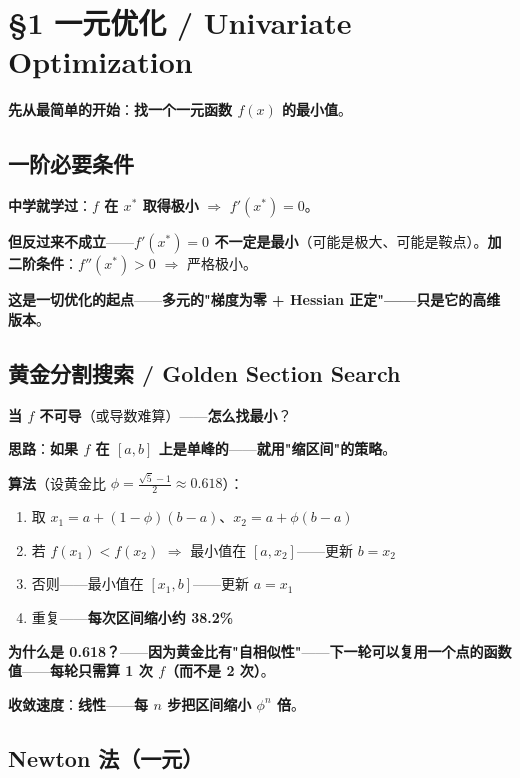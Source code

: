 \section{§1 一元优化 / Univariate Optimization}

\textbf{先从最简单的开始}：\textbf{找一个一元函数 $f(x)$ 的最小值}。

\subsection{一阶必要条件}

\textbf{中学就学过}：\textbf{$f$ 在 $x^*$ 取得极小} $\Rightarrow$ $f'(x^*) = 0$。

\textbf{但反过来不成立}——\textbf{$f'(x^*) = 0$ 不一定是最小}（可能是极大、可能是鞍点）。\textbf{加二阶条件}：$f''(x^*) > 0$ $\Rightarrow$ 严格极小。

\textbf{这是一切优化的起点}——\textbf{多元的"梯度为零 + Hessian 正定"——只是它的高维版本}。

\subsection{黄金分割搜索 / Golden Section Search}

\textbf{当 $f$ 不可导}（或导数难算）——\textbf{怎么找最小}？

\textbf{思路}：\textbf{如果 $f$ 在 $[a, b]$ 上是\textbf{单峰}的}——\textbf{就用"缩区间"的策略}。

\textbf{算法}（设黄金比 $\phi = \frac{\sqrt 5 - 1}{2} \approx 0.618$）：

\begin{enumerate}
\item 取 $x_1 = a + (1-\phi)(b-a)$、$x_2 = a + \phi(b-a)$
\item 若 $f(x_1) < f(x_2)$ $\Rightarrow$ 最小值在 $[a, x_2]$——更新 $b = x_2$
\item 否则——最小值在 $[x_1, b]$——更新 $a = x_1$
\item 重复——\textbf{每次区间缩小约 38.2\%}
\end{enumerate}

\textbf{为什么是 0.618？}——\textbf{因为黄金比有"自相似性"}——\textbf{下一轮可以\textbf{复用一个点}的函数值}——\textbf{每轮只需算 1 次 $f$（而不是 2 次）}。

\textbf{收敛速度}：\textbf{线性}——\textbf{每 $n$ 步把区间缩小 $\phi^n$ 倍}。

\subsection{Newton 法（一元）}

